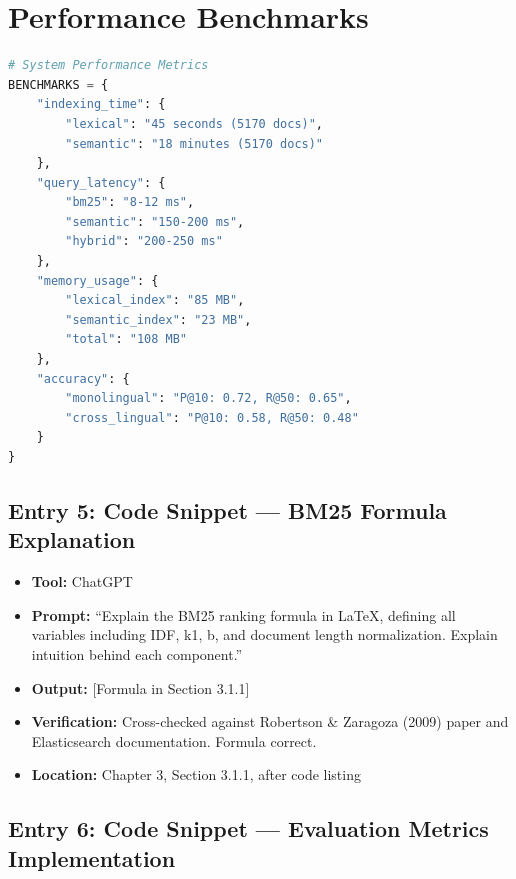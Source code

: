 \documentclass[12pt,a4paper]{report}
\begin{document}
\section{Performance Benchmarks}

\begin{lstlisting}[language=Python, caption=Benchmark Results]
# System Performance Metrics
BENCHMARKS = {
    "indexing_time": {
        "lexical": "45 seconds (5170 docs)",
        "semantic": "18 minutes (5170 docs)"
    },
    "query_latency": {
        "bm25": "8-12 ms",
        "semantic": "150-200 ms",
        "hybrid": "200-250 ms"
    },
    "memory_usage": {
        "lexical_index": "85 MB",
        "semantic_index": "23 MB",
        "total": "108 MB"
    },
    "accuracy": {
        "monolingual": "P@10: 0.72, R@50: 0.65",
        "cross_lingual": "P@10: 0.58, R@50: 0.48"
    }
}
\end{lstlisting}

\newpage

\subsection{Entry 5: Code Snippet --- BM25 Formula Explanation}

\begin{itemize}
    \item \textbf{Tool:} ChatGPT
    \item \textbf{Prompt:} ``Explain the BM25 ranking formula in LaTeX, defining all variables including IDF, k1, b, and document length normalization. Explain intuition behind each component.''
    \item \textbf{Output:} [Formula in Section 3.1.1]
    \item \textbf{Verification:} Cross-checked against Robertson \& Zaragoza (2009) paper and Elasticsearch documentation. Formula correct.
    \item \textbf{Location:} Chapter 3, Section 3.1.1, after code listing
\end{itemize}

\subsection{Entry 6: Code Snippet --- Evaluation Metrics Implementation}
\end{document}
